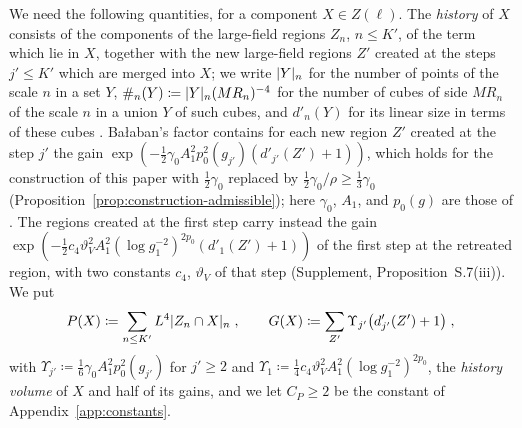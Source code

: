 \documentclass[11pt]{preprint}
\DeclarePairedDelimiter{\abs}{\lvert}{\rvert}
\numberwithin{equation}{section}
\theoremstyle{definition}
\theoremstyle{remark}
\theoremstyle{plain}
\begin{document}
We need the following quantities, for a component $X \in Z(\ell)$. The \emph{history} of $X$ consists of the components of the large-field regions $Z_n$, $n \leq K'$, of the term which lie in $X$, together with the new large-field regions $Z'$ created at the steps $j' \leq K'$ which are merged into $X$; we write $\abs{Y}_n$ for the number of points of the scale $n$ in a set $Y$, $\#_n(Y) \coloneqq \abs{Y}_n(MR_n)^{-4}$ for the number of cubes of side $MR_n$ of the scale $n$ in a union $Y$ of such cubes, and $d'_n(Y)$ for its linear size in terms of these cubes \cite[p.~380]{BalabanLFR2}. Ba{\l}aban's factor \cite[(1.79), p.~383]{BalabanLFR2} contains for each new region $Z'$ created at the step $j'$ the gain $\exp(-\frac12\gamma_0A_1^2p_0^2(g_{j'})(d'_{j'}(Z') + 1))$, which holds for the construction of this paper with $\frac12\gamma_0$ replaced by $\frac12\gamma_0/\rho \geq \frac13\gamma_0$ (Proposition~\ref{prop:construction-admissible}); here $\gamma_0$, $A_1$, and $p_0(g)$ are those of \cite{BalabanLFR2}. The regions created at the first step carry instead the gain $\exp(-\frac12c_4\vartheta_V^2A_1^2(\log g_1^{-2})^{2p_0}(d'_1(Z') + 1))$ of the first step at the retreated region, with two constants $c_4$, $\vartheta_V$ of that step (Supplement, Proposition~S.7(iii)). We put
\begin{equation}\label{eq:history-quantities}
    P(X) \coloneqq \sum_{n \leq K'}L^4\abs{Z_n \cap X}_n\;,
    \qquad
    G(X) \coloneqq \sum_{Z'}\Upsilon_{j'}\bigl(d'_{j'}(Z') + 1\bigr)\;,
\end{equation}
with $\Upsilon_{j'} \coloneqq \frac16\gamma_0A_1^2p_0^2(g_{j'})$ for $j' \geq 2$ and $\Upsilon_1 \coloneqq \frac14c_4\vartheta_V^2A_1^2(\log g_1^{-2})^{2p_0}$, the \emph{history volume} of $X$ and half of its gains, and we let $C_P \geq 2$ be the constant of Appendix~\ref{app:constants}.
\end{document}
